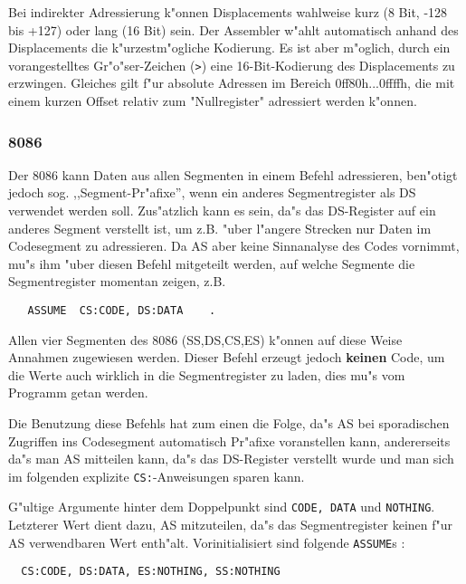 \documentclass[12pt,a4paper,twoside]{report}
\newcommand{\bb}[1]{{\bf #1}}
\newcommand{\tty}[1]{{\tt #1}}
\begin{document}
Bei indirekter Adressierung k"onnen Displacements wahlweise kurz (8 Bit,
-128 bis +127) oder lang (16 Bit) sein.  Der Assembler w"ahlt automatisch
anhand des Displacements die k"urzestm"ogliche Kodierung.  Es ist aber m"oglich,
durch ein vorangestelltes Gr"o"ser-Zeichen (\verb!>!) eine 16-Bit-Kodierung
des Displacements zu erzwingen.  Gleiches gilt f"ur absolute Adressen im
Bereich 0ff80h...0ffffh, die mit einem kurzen Offset relativ zum "Nullregister"
adressiert werden k"onnen.


\subsubsection{8086}

Der 8086 kann Daten aus allen Segmenten in einem Befehl adressieren,
ben"otigt jedoch sog. ,,Segment-Pr"afixe'', wenn ein anderes Segmentregister
als DS verwendet werden soll.  Zus"atzlich kann es sein, da"s das
DS-Register auf ein anderes Segment verstellt ist, um z.B. "uber l"angere
Strecken nur Daten im Codesegment zu adressieren.  Da AS aber keine
Sinnanalyse des Codes vornimmt, mu"s ihm "uber diesen Befehl mitgeteilt
werden, auf welche Segmente die Segmentregister momentan zeigen, z.B.
\begin{verbatim}
   ASSUME  CS:CODE, DS:DATA    .
\end{verbatim}
Allen vier Segmenten des 8086 (SS,DS,CS,ES) k"onnen auf diese Weise Annahmen
zugewiesen werden.  Dieser Befehl erzeugt jedoch \bb{keinen} Code, um
die Werte auch wirklich in die Segmentregister zu laden, dies mu"s vom
Programm getan werden.
\par
Die Benutzung diese Befehls hat zum einen die Folge, da"s AS bei
sporadischen Zugriffen ins Codesegment automatisch Pr"afixe voranstellen
kann, andererseits da"s man AS mitteilen kann, da"s das DS-Register verstellt
wurde und man sich im folgenden explizite \tty{CS:}-Anweisungen sparen
kann.
\par
G"ultige Argumente hinter dem Doppelpunkt sind \tty{CODE, DATA} und
\tty{NOTHING}.  Letzterer Wert dient dazu, AS mitzuteilen, da"s das
Segmentregister keinen f"ur AS verwendbaren Wert enth"alt.
Vorinitialisiert sind folgende \tty{ASSUME}s :
\begin{verbatim}
  CS:CODE, DS:DATA, ES:NOTHING, SS:NOTHING
\end{verbatim}

\end{document}

